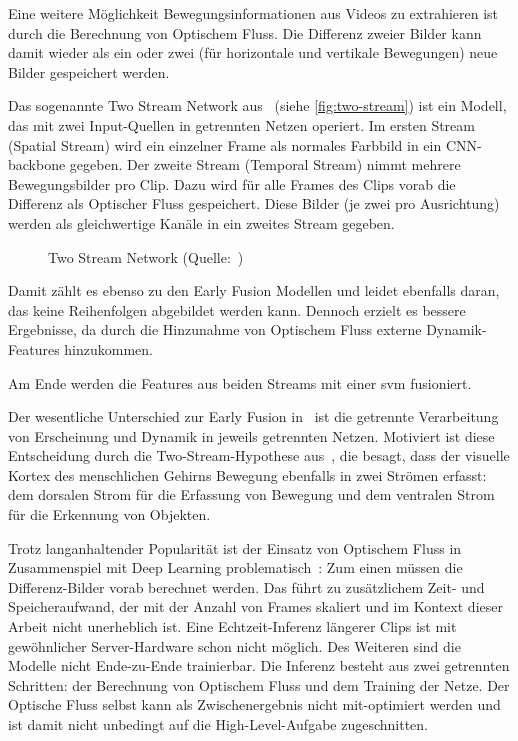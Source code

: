 Eine weitere Möglichkeit Bewegungsinformationen aus Videos zu extrahieren ist durch die Berechnung von Optischem Fluss.
Die Differenz zweier Bilder kann damit wieder als ein oder zwei (für horizontale und vertikale Bewegungen) neue Bilder gespeichert werden.

Das sogenannte Two Stream Network aus~\cite{Simonyan14} (siehe \autoref{fig:two-stream}) ist ein Modell, das mit zwei Input-Quellen in getrennten Netzen operiert.
Im ersten Stream (Spatial Stream) wird ein einzelner Frame als normales Farbbild in ein CNN-backbone gegeben.
Der zweite Stream (Temporal Stream) nimmt mehrere Bewegungsbilder pro Clip.
Dazu wird für alle Frames des Clips vorab die Differenz als Optischer Fluss gespeichert.
Diese Bilder (je zwei pro Ausrichtung) werden als gleichwertige Kanäle in ein zweites Stream gegeben.

\begin{figure}[h!]
    \centering
    \caption{Two Stream Network (Quelle:~\cite{Simonyan14})}
    \label{fig:two-stream}
\end{figure}

Damit zählt es ebenso zu den Early Fusion Modellen und leidet ebenfalls daran, das keine Reihenfolgen abgebildet werden kann.
Dennoch erzielt es bessere Ergebnisse, da durch die Hinzunahme von Optischem Fluss externe Dynamik-Features hinzukommen.

Am Ende werden die Features aus beiden Streams mit einer \gls{svm} fusioniert.

Der wesentliche Unterschied zur Early Fusion in~\cite{Karpathy14} ist die getrennte Verarbeitung von Erscheinung und Dynamik in jeweils getrennten Netzen.
Motiviert ist diese Entscheidung durch die Two-Stream-Hypothese aus~\cite{Goodale92}, die besagt, dass der visuelle Kortex des menschlichen Gehirns Bewegung ebenfalls in zwei Strömen erfasst:
dem dorsalen Strom für die Erfassung von Bewegung und dem ventralen Strom für die Erkennung von Objekten.

Trotz langanhaltender Popularität ist der Einsatz von Optischem Fluss in Zusammenspiel mit Deep Learning problematisch~\cite{Zhu17}:
Zum einen müssen die Differenz-Bilder vorab berechnet werden.
Das führt zu zusätzlichem Zeit- und Speicheraufwand, der mit der Anzahl von Frames skaliert und im Kontext dieser Arbeit nicht unerheblich ist.
Eine Echtzeit-Inferenz längerer Clips ist mit gewöhnlicher Server-Hardware schon nicht möglich.
Des Weiteren sind die Modelle nicht Ende-zu-Ende trainierbar.
Die Inferenz besteht aus zwei getrennten Schritten: der Berechnung von Optischem Fluss und dem Training der Netze.
Der Optische Fluss selbst kann als Zwischenergebnis nicht mit-optimiert werden und ist damit nicht unbedingt auf die High-Level-Aufgabe zugeschnitten.

